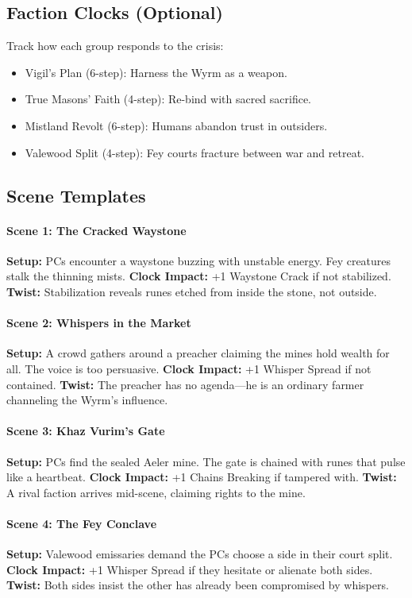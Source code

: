 \documentclass[12pt]{article}
\begin{document}
\subsection*{Faction Clocks (Optional)}
Track how each group responds to the crisis:
\begin{itemize}
  \item Vigil’s Plan (6-step): Harness the Wyrm as a weapon.
  \item True Masons’ Faith (4-step): Re-bind with sacred sacrifice.
  \item Mistland Revolt (6-step): Humans abandon trust in outsiders.
  \item Valewood Split (4-step): Fey courts fracture between war and retreat.
\end{itemize}

\subsection*{Scene Templates}

\paragraph{Scene 1: The Cracked Waystone}
\textbf{Setup:} PCs encounter a waystone buzzing with unstable energy. Fey creatures stalk the thinning mists.
\textbf{Clock Impact:} +1 Waystone Crack if not stabilized.
\textbf{Twist:} Stabilization reveals runes etched from inside the stone, not outside.

\paragraph{Scene 2: Whispers in the Market}
\textbf{Setup:} A crowd gathers around a preacher claiming the mines hold wealth for all. The voice is too persuasive.
\textbf{Clock Impact:} +1 Whisper Spread if not contained.
\textbf{Twist:} The preacher has no agenda—he is an ordinary farmer channeling the Wyrm’s influence.

\paragraph{Scene 3: Khaz Vurim’s Gate}
\textbf{Setup:} PCs find the sealed Aeler mine. The gate is chained with runes that pulse like a heartbeat.
\textbf{Clock Impact:} +1 Chains Breaking if tampered with.
\textbf{Twist:} A rival faction arrives mid-scene, claiming rights to the mine.

\paragraph{Scene 4: The Fey Conclave}
\textbf{Setup:} Valewood emissaries demand the PCs choose a side in their court split.
\textbf{Clock Impact:} +1 Whisper Spread if they hesitate or alienate both sides.
\textbf{Twist:} Both sides insist the other has already been compromised by whispers.
\end{document}
